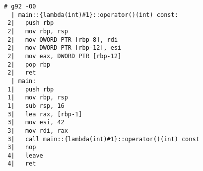\begin{lstlisting}[language={},numbers=none,title=\href{https://godbolt.org/z/963TMh}{\texttt{godbolt.org/z/963TMh}}]
# g92 -O0
  | main::{lambda(int)#1}::operator()(int) const:
 2|   push rbp
 2|   mov rbp, rsp
 2|   mov QWORD PTR [rbp-8], rdi
 2|   mov DWORD PTR [rbp-12], esi
 2|   mov eax, DWORD PTR [rbp-12]
 2|   pop rbp
 2|   ret
  | main:
 1|   push rbp
 1|   mov rbp, rsp
 1|   sub rsp, 16
 3|   lea rax, [rbp-1]
 3|   mov esi, 42
 3|   mov rdi, rax
 3|   call main::{lambda(int)#1}::operator()(int) const
 3|   nop
 4|   leave
 4|   ret
\end{lstlisting}
